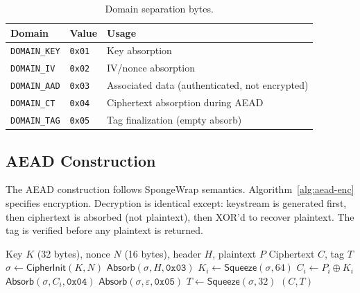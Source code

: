 \documentclass[runningheads]{llncs}
\begin{document}
\begin{table}[h]
\centering
\caption{Domain separation bytes.}
\label{tab:domains}
\begin{tabular}{@{}lll@{}}
\toprule
Domain & Value & Usage \\
\midrule
\texttt{DOMAIN\_KEY} & \texttt{0x01} & Key absorption \\
\texttt{DOMAIN\_IV}  & \texttt{0x02} & IV/nonce absorption \\
\texttt{DOMAIN\_AAD} & \texttt{0x03} & Associated data (authenticated, not encrypted) \\
\texttt{DOMAIN\_CT}  & \texttt{0x04} & Ciphertext absorption during AEAD \\
\texttt{DOMAIN\_TAG} & \texttt{0x05} & Tag finalization (empty absorb) \\
\bottomrule
\end{tabular}
\end{table}

\subsection{AEAD Construction}

The AEAD construction follows SpongeWrap semantics.
Algorithm~\ref{alg:aead-enc} specifies encryption.
Decryption is identical except: keystream is generated
first, then ciphertext is absorbed (not plaintext),
then XOR'd to recover plaintext.  The tag is verified
before any plaintext is returned.

\begin{algorithm}[t]
\caption{CATWALK AEAD encryption.}
\label{alg:aead-enc}
\begin{algorithmic}[1]
\Require Key $K$ (32 bytes), nonce $N$ (16 bytes),
         header $H$, plaintext $P$
\Ensure Ciphertext $C$, tag $T$
\State $\sigma \gets \mathsf{CipherInit}(K, N)$
\State $\mathsf{Absorb}(\sigma, H, \texttt{0x03})$
  \State $K_i \gets \mathsf{Squeeze}(\sigma, 64)$
  \State $C_i \gets P_i \oplus K_i$
  \State $\mathsf{Absorb}(\sigma, C_i, \texttt{0x04})$
\EndFor
\State $\mathsf{Absorb}(\sigma, \varepsilon, \texttt{0x05})$
\State $T \gets \mathsf{Squeeze}(\sigma, 32)$
\State \Return $(C, T)$
\end{algorithmic}
\end{algorithm}
\end{document}
